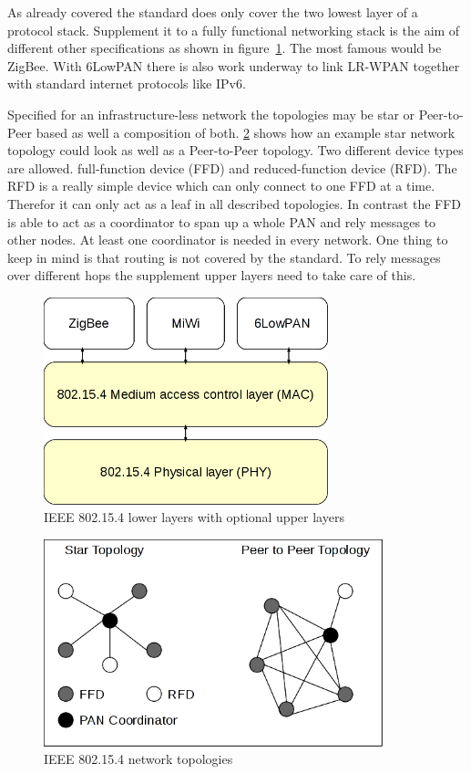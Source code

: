 As already covered the standard does only cover the two lowest layer of a
protocol stack. Supplement it to a fully functional networking stack is the aim
of different other specifications as shown in figure~\ref{fig:802154layer}. The
most famous would be ZigBee. With 6LowPAN there is also work underway to link
LR-WPAN together with standard internet protocols like IPv6.

Specified for an infrastructure-less network the topologies may be star or
Peer-to-Peer based as well a composition of both. \ref{fig:802154topologies}
shows how an example star network topology could look as well as a Peer-to-Peer
topology. Two different device types are allowed. full-function device (FFD) and
reduced-function device (RFD). The RFD is a really simple device which can only
connect to one FFD at a time. Therefor it can only act as a leaf in all
described topologies. In contrast the FFD is able to act as a coordinator to
span up a whole PAN and rely messages to other nodes. At least one coordinator
is needed in every network. One thing to keep in mind is that routing is not
covered by the standard. To rely messages over different hops the supplement
upper layers need to take care of this.

\begin{figure}
  \begin{center}
    \includegraphics[height=6cm]{images/802154layer}
    \caption{IEEE 802.15.4 lower layers with optional upper layers}
        \label{fig:802154layer}
  \end{center}
\end{figure}

\begin{figure}
  \begin{center}
    \includegraphics[height=6cm]{images/802154topology}
    \caption{IEEE 802.15.4 network topologies}
        \label{fig:802154topologies}
  \end{center}
\end{figure}

